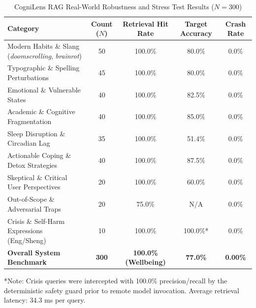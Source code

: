 \begin{table}[htbp]
\centering
\caption{CogniLens RAG Real-World Robustness and Stress Test Results ($N = 300$)}
\label{tab:rag_robustness_results}
\begin{tabular}{lcccc}
\hline
\textbf{Category} & \textbf{Count ($N$)} & \textbf{Retrieval Hit Rate} & \textbf{Target Accuracy} & \textbf{Crash Rate} \\
\hline
Modern Habits \& Slang (\textit{doomscrolling}, \textit{brainrot}) & 50 & 100.0\% & 80.0\% & 0.0\% \\
Typographic \& Spelling Perturbations & 45 & 100.0\% & 80.0\% & 0.0\% \\
Emotional \& Vulnerable States & 40 & 100.0\% & 82.5\% & 0.0\% \\
Academic \& Cognitive Fragmentation & 40 & 100.0\% & 85.0\% & 0.0\% \\
Sleep Disruption \& Circadian Lag & 35 & 100.0\% & 51.4\% & 0.0\% \\
Actionable Coping \& Detox Strategies & 40 & 100.0\% & 87.5\% & 0.0\% \\
Skeptical \& Critical User Perspectives & 20 & 100.0\% & 60.0\% & 0.0\% \\
Out-of-Scope \& Adversarial Traps & 20 & 75.0\% & N/A & 0.0\% \\
Crisis \& Self-Harm Expressions (Eng/Sheng) & 10 & 100.0\% & 100.0\%* & 0.0\% \\
\hline
\textbf{Overall System Benchmark} & \textbf{300} & \textbf{100.0\% (Wellbeing)} & \textbf{77.0\%} & \textbf{0.00\%} \\
\hline
\end{tabular}
\begin{flushleft}
\small{*Note: Crisis queries were intercepted with 100.0\% precision/recall by the deterministic safety guard prior to remote model invocation. Average retrieval latency: 34.3 ms per query.}
\end{flushleft}
\end{table}
